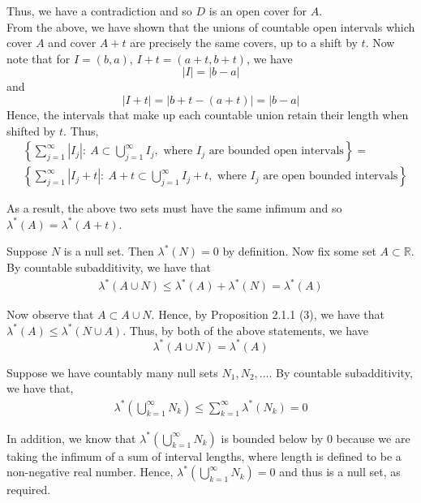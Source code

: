 \documentclass[12pt]{article}
\newenvironment{problem}[2][Problem]{\begin{trivlist}
\item[\hskip \labelsep {\bfseries #1}\hskip \labelsep {\bfseries #2.}]}{\end{trivlist}}
\begin{document}
Thus, we have a contradiction and so $D$ is an open cover for $A$.\\

From the above, we have shown that the unions of countable open intervals which cover $A$ and cover $A+t$ are precisely the same covers, up to a shift by $t$. Now note that for $I = (b, a)$, $I+t = (a+t, b+t)$, we have $$|I| = |b - a|$$ and $$|I + t| = |b + t - (a + t)| = |b - a|$$ Hence, the intervals that make up each countable union retain their length when shifted by $t$. Thus,
\begin{align*}
&\left\{\sum_{j=1}^{\infty} |I_j|: \ A \subset \bigcup_{j=1}^{\infty} I_j, \text{ where } I_j \text{ are bounded open intervals}\right\} =\\
&\left\{\sum_{j=1}^{\infty} |I_j + t|: \ A+t \subset \bigcup_{j=1}^{\infty} I_j+t, \text{ where } I_j \text{ are open bounded intervals}\right\}
\end{align*}

As a result, the above two sets must have the same infimum and so $\lambda^*(A) = \lambda^*(A+t)$.

\begin{problem}{5}
\end{problem}

Suppose $N$ is a null set. Then $\lambda^*(N) = 0$ by definition. Now fix some set $A \subset \mathbb{R}$. By countable subadditivity, we have that
\begin{align*}
\lambda^*(A \cup N) \leq \lambda^*(A) + \lambda^*(N) = \lambda^*(A)
\end{align*}

Now observe that $A \subset A \cup N$. Hence, by Proposition 2.1.1 (3), we have that $\lambda^*(A) \leq \lambda^*(N \cup A)$. Thus, by both of the above statements, we have $$\lambda^*(A \cup N) = \lambda^*(A)$$

\begin{problem}{7}
\end{problem}

Suppose we have countably many null sets $N_1, N_2, \ldots$. By countable subadditivity, we have that,
\begin{align*}
\lambda^*\left(\bigcup_{k=1}^{\infty} N_k\right) \leq \sum_{k=1}^{\infty} \lambda^*(N_k) = 0
\end{align*}

In addition, we know that $\lambda^*\left(\bigcup_{k=1}^{\infty} N_k\right)$ is bounded below by $0$ because we are taking the infimum of a sum of interval lengths, where length is defined to be a non-negative real number. Hence, $\lambda^*\left(\bigcup_{k=1}^{\infty} N_k\right) = 0$ and thus is a null set, as required.
\end{document}
